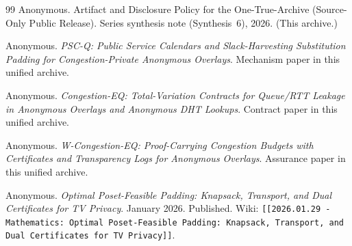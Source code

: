 \documentclass[11pt]{article}
\theoremstyle{definition}
\theoremstyle{remark}
\begin{document}
\begin{thebibliography}{99}
Anonymous.
\newblock Artifact and Disclosure Policy for the One-True-Archive (Source-Only Public Release).
\newblock Series synthesis note (Synthesis~6), 2026. (This archive.)


Anonymous.
\newblock \emph{PSC-Q: Public Service Calendars and Slack-Harvesting Substitution Padding for Congestion-Private Anonymous Overlays}.
\newblock Mechanism paper in this unified archive.

Anonymous.
\newblock \emph{Congestion-EQ: Total-Variation Contracts for Queue/RTT Leakage in Anonymous Overlays and Anonymous DHT Lookups}.
\newblock Contract paper in this unified archive.

Anonymous.
\newblock \emph{W-Congestion-EQ: Proof-Carrying Congestion Budgets with Certificates and Transparency Logs for Anonymous Overlays}.
\newblock Assurance paper in this unified archive.

Anonymous.
\newblock \emph{Optimal Poset-Feasible Padding: Knapsack, Transport, and Dual Certificates for TV Privacy}.
\newblock January 2026. Published. Wiki: \texttt{[[2026.01.29 - Mathematics: Optimal Poset-Feasible Padding: Knapsack, Transport, and Dual Certificates for TV Privacy]]}.



\end{thebibliography}
\end{document}
